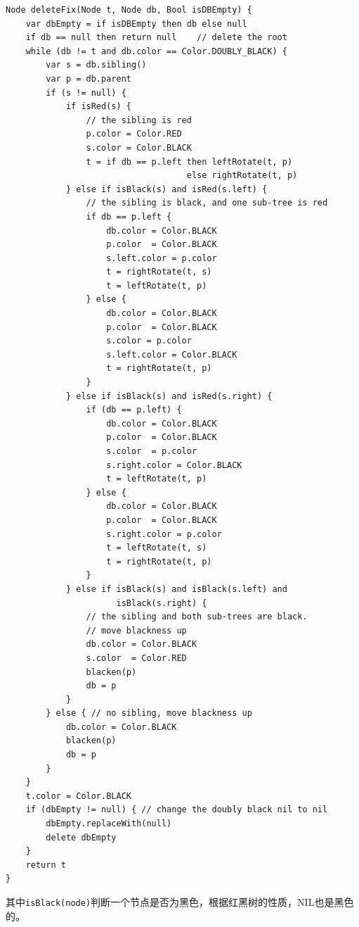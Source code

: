 \documentclass[b5paper]{ctexart}
\begin{document}
\begin{lstlisting}[language = Bourbaki]
Node deleteFix(Node t, Node db, Bool isDBEmpty) {
    var dbEmpty = if isDBEmpty then db else null
    if db == null then return null    // delete the root
    while (db != t and db.color == Color.DOUBLY_BLACK) {
        var s = db.sibling()
        var p = db.parent
        if (s != null) {
            if isRed(s) {
                // the sibling is red
                p.color = Color.RED
                s.color = Color.BLACK
                t = if db == p.left then leftRotate(t, p)
                                    else rightRotate(t, p)
            } else if isBlack(s) and isRed(s.left) {
                // the sibling is black, and one sub-tree is red
                if db == p.left {
                    db.color = Color.BLACK
                    p.color  = Color.BLACK
                    s.left.color = p.color
                    t = rightRotate(t, s)
                    t = leftRotate(t, p)
                } else {
                    db.color = Color.BLACK
                    p.color  = Color.BLACK
                    s.color = p.color
                    s.left.color = Color.BLACK
                    t = rightRotate(t, p)
                }
            } else if isBlack(s) and isRed(s.right) {
                if (db == p.left) {
                    db.color = Color.BLACK
                    p.color  = Color.BLACK
                    s.color  = p.color
                    s.right.color = Color.BLACK
                    t = leftRotate(t, p)
                } else {
                    db.color = Color.BLACK
                    p.color  = Color.BLACK
                    s.right.color = p.color
                    t = leftRotate(t, s)
                    t = rightRotate(t, p)
                }
            } else if isBlack(s) and isBlack(s.left) and
                      isBlack(s.right) {
                // the sibling and both sub-trees are black.
                // move blackness up
                db.color = Color.BLACK
                s.color  = Color.RED
                blacken(p)
                db = p
            }
        } else { // no sibling, move blackness up
            db.color = Color.BLACK
            blacken(p)
            db = p
        }
    }
    t.color = Color.BLACK
    if (dbEmpty != null) { // change the doubly black nil to nil
        dbEmpty.replaceWith(null)
        delete dbEmpty
    }
    return t
}
\end{lstlisting}

其中\texttt{isBlack(node)}判断一个节点是否为黑色，根据红黑树的性质，NIL也是黑色的。
\end{document}
